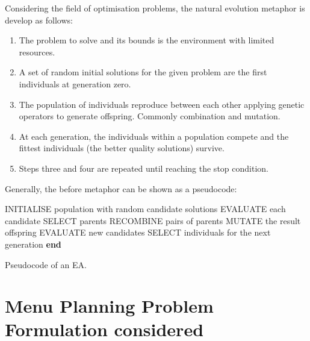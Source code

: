 Considering the field of optimisation problems, the natural evolution metaphor is develop as follows:
\begin{enumerate}
    \item The problem to solve and its bounds is the environment with limited resources.
    \item A set of random initial solutions for the given problem are the first individuals at generation zero. 
    \item The population of individuals reproduce between each other applying genetic operators to generate offspring. Commonly combination and mutation.
    \item At each generation, the individuals within a population compete and the fittest individuals (the better quality solutions) survive.
    \item Steps three and four are repeated until reaching the stop condition.
\end{enumerate}
Generally, the before metaphor can be shown as a pseudocode\cite{eiben}:

\begin{algorithm}[H]
\begin{algorithmic}[1]
  \State INITIALISE population with random candidate solutions
  \State EVALUATE each candidate
    \State SELECT parents
    \State RECOMBINE pairs of parents
    \State MUTATE the result offspring
    \State EVALUATE new candidates
    \State SELECT individuals for the next generation 
  \EndWhile
  \State \textbf{end}
  \end{algorithmic}
  \caption{Pseudocode of an EA.}
\end{algorithm}


\newpage
\section{Menu Planning Problem Formulation considered}

